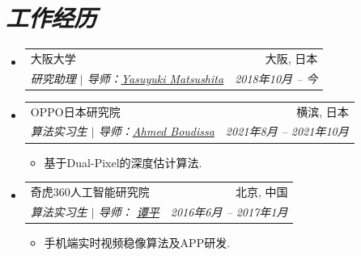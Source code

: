 \documentclass[UTF8]{ctexart}
\makeatletter
\newcommand{\resumeItem}[1]{
	\item\small{
		{#1 \vspace{-2pt}}
	}
}
\newcommand{\resumeSubheading}[4]{
	\vspace{-2pt}\item
	\begin{tabular*}{0.97\textwidth}[t]{l@{\extracolsep{\fill}}r}
		#1 & #2 \\
		\textit{\small#3} & \textit{\small #4} \\
	\end{tabular*}\vspace{-7pt}
}
\newcommand{\resumeSubHeadingListStart}{\begin{itemize}[leftmargin=0.15in, label={}]}
\newcommand{\resumeSubHeadingListEnd}{\end{itemize}}
\newcommand{\resumeItemListStart}{\begin{itemize}}
\newcommand{\resumeItemListEnd}{\end{itemize}\vspace{-5pt}}
\makeatother
\begin{document}
	\section{\textit{\textbf{工作经历}}}
	\resumeSubHeadingListStart
	\resumeSubheading
	{大阪大学}{大阪, 日本}
	{研究助理 \quad$|$  导师：\href{http://cvl.ist.osaka-u.ac.jp/en/member/matsushita/}{Yasuyuki Matsushita}}{\rm  2018年10月 -- 今}
	\vspace{0.3em}
	\resumeSubheading
	{OPPO日本研究院}{横滨, 日本}
	{算法实习生  $|$ 导师：\href{https://www.linkedin.com/in/ahmedboudissa/?originalSubdomain=jp}{Ahmed Boudissa}}{\rm  2021年8月 -- 2021年10月}
	\resumeItemListStart
	\resumeItem{基于Dual-Pixel的深度估计算法.}
	\resumeItemListEnd
	\vspace{0.3em}
	\resumeSubheading
	{奇虎360人工智能研究院}{北京, 中国}
	{算法实习生 $|$ 导师： \href{https://www.cs.sfu.ca/~pingtan/}{谭平}}{\rm  2016年6月 -- 2017年1月}
	\resumeItemListStart
	\resumeItem{手机端实时视频稳像算法及APP研发.}
	\resumeItemListEnd
	
	\resumeSubHeadingListEnd
	
	
	
\end{document}
